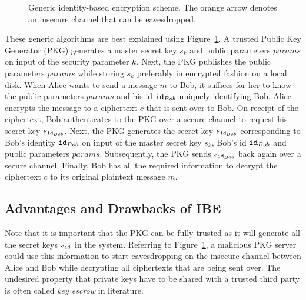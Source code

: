 \begin{figure}[ht]
\begin{center}
{
    }
    \end{center}
    \caption{Generic identity-based encryption scheme. The orange arrow denotes an insecure channel that can be eavesdropped.}
    \label{fig:generic_ibe_scheme}
\end{figure}

These generic algorithms are best explained using Figure~\ref{fig:generic_ibe_scheme}. A trusted Public Key Generator (PKG) generates a master secret key $s_k$ and public parameters $params$ on input of the security parameter $k$. Next, the PKG publishes the public parameters $params$ while storing $s_k$ preferably in encrypted fashion on a local disk. When Alice wants to send a message $m$ to Bob, it suffices for her to know the public parameters $params$ and his id $\mathtt{id}_{Bob}$ uniquely identifying Bob. Alice encrypts the message to a ciphertext $c$ that is sent over to Bob. On receipt of the ciphertext, Bob authenticates to the PKG over a secure channel to request his secret key $s_{\mathtt{id}_{Bob}}$. Next, the PKG generates the secret key $s_{\mathtt{id}_{Bob}}$ corresponding to Bob's identity $\mathtt{id}_{Bob}$ on input of the master secret key $s_k$, Bob's id $\mathtt{id}_{Bob}$ and public parameters $params$. Subsequently, the PKG sends $s_{\mathtt{id}_{Bob}}$ back again over a secure channel. Finally, Bob has all the required information to decrypt the ciphertext $c$ to its original plaintext message $m$.

\subsection{Advantages and Drawbacks of IBE}
Note that it is important that the PKG can be fully trusted as it will generate all the secret keys $s_{\mathtt{id}_{}}$ in the system. Referring to Figure~\ref{fig:generic_ibe_scheme}, a malicious PKG server could use this information to start eavesdropping on the insecure channel between Alice and Bob while decrypting all ciphertexts that are being sent over. The undesired property that private keys have to be shared with a trusted third party is often called \textit{key escrow} in literature.

